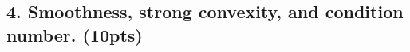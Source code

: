 \documentclass[10pt]{article}
\DeclareMathOperator{\R}{\mathbb{R}}
\newcommand{\E}{\mathbb{E}}
\begin{document}
%
%	
%	
%	


\vspace{10em}

\newpage
\subsection{4. Smoothness, strong convexity, and condition number. (\textbf{\small 10pts})}
\end{document}
